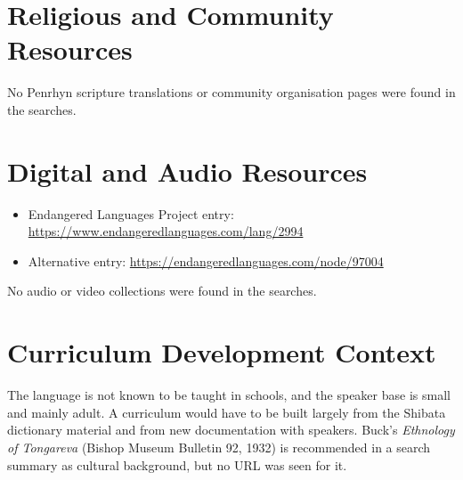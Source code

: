 \documentclass[12pt]{article}
\begin{document}
\section{Religious and Community Resources}
No Penrhyn scripture translations or community organisation pages were found in the searches.

\section{Digital and Audio Resources}
\begin{itemize}
\item Endangered Languages Project entry: \url{https://www.endangeredlanguages.com/lang/2994}
\item Alternative entry: \url{https://endangeredlanguages.com/node/97004}
\end{itemize}
No audio or video collections were found in the searches.

\section{Curriculum Development Context}
The language is not known to be taught in schools, and the speaker base is small and mainly adult. A curriculum would have to be built largely from the Shibata dictionary material and from new documentation with speakers. Buck's \emph{Ethnology of Tongareva} (Bishop Museum Bulletin 92, 1932) is recommended in a search summary as cultural background, but no URL was seen for it.
\end{document}
